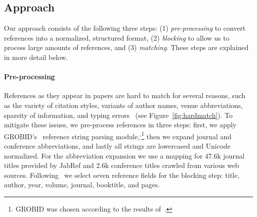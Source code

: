
\subsection{Approach}

Our approach consists of the following three steps: (1) \emph{pre-processing} to convert references into a normalized, structured format, (2) \emph{blocking} to allow us to process large amounts of references, and (3) \emph{matching}. These steps are explained in more detail below.


\paragraph{Pre-processing}
References as they appear in papers are hard to match for several reasons, such as the variety of citation styles, variants of author names, venue abbreviations, sparsity of information, and typing errors~\cite{Christen2012} (see Figure~\ref{fig:hardmatch}). To mitigate these issues, we pre-process references in three steps: first, we apply GROBID's~\cite{Lopez2009} reference string parsing module,\textsuperscript{,}\footnote{GROBID was chosen according to the results of~\cite{Tkaczyk2018}.} then we expand journal and conference abbreviations, and lastly all strings are lowercased and Unicode normalized. For the abbreviation expansion we use a mapping for 47.6k journal titles provided by JabRef and 2.6k conference titles crawled from various web sources. Following~\cite{Koo2011} we select seven reference fields for the blocking step: title, author, year, volume, journal, booktitle, and pages.

